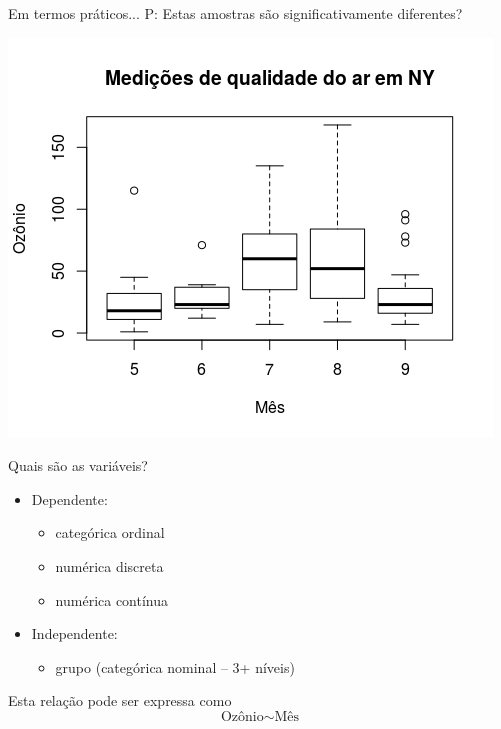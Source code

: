 \documentclass{beamer}
\begin{document}
\begin{frame}{Em termos práticos...}
P: Estas amostras são significativamente diferentes?

  \centering
  \includegraphics[height=.9\textheight]{Cap37-38/3samples-bp}
\end{frame}

\begin{frame}{Quais são as variáveis?}
  \begin{itemize}
    \small
  \item Dependente:
    \begin{itemize}
      \footnotesize
    \item categórica ordinal
    \item numérica discreta
    \item numérica contínua
    \end{itemize}
  \item Independente:
    \begin{itemize}
      \footnotesize
    \item grupo (categórica nominal -- 3+ níveis)
    \end{itemize}
  \end{itemize}
  \vfill
  \begin{block}{Esta relação pode ser expressa como}
    \begin{displaymath}
      \text{Ozônio} \sim \text{Mês}
    \end{displaymath}
  \end{block}
\end{frame}
\end{document}
